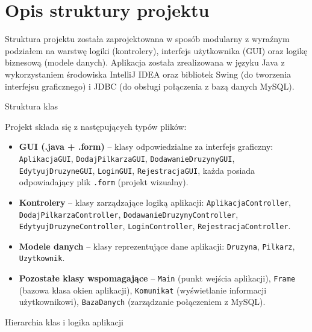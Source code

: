 \documentclass{urdpl}     %
\begin{document}
\chapter{Opis struktury projektu}

Struktura projektu została zaprojektowana w sposób modularny z wyraźnym podziałem na warstwę logiki (kontrolery), interfejs użytkownika (GUI) oraz logikę biznesową (modele danych). Aplikacja została zrealizowana w języku Java z wykorzystaniem środowiska IntelliJ IDEA oraz bibliotek Swing (do tworzenia interfejsu graficznego) i JDBC (do obsługi połączenia z bazą danych MySQL).

Struktura klas

Projekt składa się z następujących typów plików:

\begin{itemize}
  \item \textbf{GUI (.java + .form)} – klasy odpowiedzialne za interfejs graficzny: \texttt{AplikacjaGUI}, \texttt{DodajPilkarzaGUI}, \texttt{DodawanieDruzynyGUI}, \texttt{EdytyujDruzyneGUI}, \texttt{LoginGUI}, \texttt{RejestracjaGUI}, każda posiada odpowiadający plik \texttt{.form} (projekt wizualny).
  \item \textbf{Kontrolery} – klasy zarządzające logiką aplikacji: \texttt{AplikacjaController}, \texttt{DodajPilkarzaController}, \texttt{DodawanieDruzynyController}, \texttt{EdytyujDruzyneController}, \texttt{LoginController}, \texttt{RejestracjaController}.
  \item \textbf{Modele danych} – klasy reprezentujące dane aplikacji: \texttt{Druzyna}, \texttt{Pilkarz}, \texttt{Uzytkownik}.
  \item \textbf{Pozostałe klasy wspomagające} – \texttt{Main} (punkt wejścia aplikacji), \texttt{Frame} (bazowa klasa okien aplikacji), \texttt{Komunikat} (wyświetlanie informacji użytkownikowi), \texttt{BazaDanych} (zarządzanie połączeniem z MySQL).
\end{itemize}

Hierarchia klas i logika aplikacji
\end{document}
